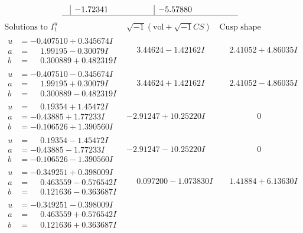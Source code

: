 \documentclass[1p]{elsarticle_modified}
\theoremstyle{definition}
\newcommand{\I}{\sqrt{-1}}
\begin{document}
$$\begin{array}{c|c|c}
 & -1.72341\phantom{ +0.000000I} & -5.57880\phantom{ +0.000000I}\\
 \hline 
 \end{array}$$\newpage$$\begin{array}{c|c|c}  
\text{Solutions to }I^u_{1}& \I (\text{vol} + \sqrt{-1}CS) & \text{Cusp shape}\\
 \hline 
\begin{aligned}
u &= -0.407510 + 0.345674 I \\
a &= \phantom{-}1.99195 - 0.30079 I \\
b &= \phantom{-}0.300889 + 0.482319 I\end{aligned}
 & \phantom{-}3.44624 - 1.42162 I & \phantom{-}2.41052 + 4.86035 I \\ \hline\begin{aligned}
u &= -0.407510 - 0.345674 I \\
a &= \phantom{-}1.99195 + 0.30079 I \\
b &= \phantom{-}0.300889 - 0.482319 I\end{aligned}
 & \phantom{-}3.44624 + 1.42162 I & \phantom{-}2.41052 - 4.86035 I \\ \hline\begin{aligned}
u &= \phantom{-}0.19354 + 1.45472 I \\
a &= -0.43885 + 1.77233 I \\
b &= -0.106526 + 1.390560 I\end{aligned}
 & -2.91247 + 10.25220 I & \phantom{-0.000000 } 0 \\ \hline\begin{aligned}
u &= \phantom{-}0.19354 - 1.45472 I \\
a &= -0.43885 - 1.77233 I \\
b &= -0.106526 - 1.390560 I\end{aligned}
 & -2.91247 - 10.25220 I & \phantom{-0.000000 } 0 \\ \hline\begin{aligned}
u &= -0.349251 + 0.398009 I \\
a &= \phantom{-}0.463559 - 0.576542 I \\
b &= \phantom{-}0.121636 - 0.363687 I\end{aligned}
 & \phantom{-}0.097200 - 1.073830 I & \phantom{-}1.41884 + 6.13630 I \\ \hline\begin{aligned}
u &= -0.349251 - 0.398009 I \\
a &= \phantom{-}0.463559 + 0.576542 I \\
b &= \phantom{-}0.121636 + 0.363687 I\end{aligned}

\end{array}$$
\end{document}
